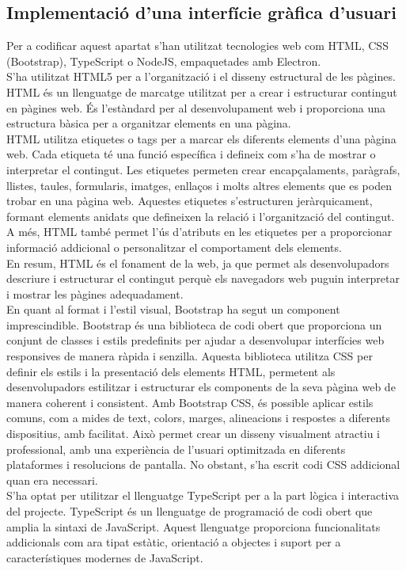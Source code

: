 \subsection{Implementació d’una interfície gràfica d'usuari}
Per a codificar aquest apartat s'han utilitzat tecnologies web com HTML, CSS (Bootstrap), TypeScript o NodeJS, empaquetades amb Electron.
\\[3mm]
S'ha utilitzat HTML5 per a l'organització i el disseny estructural de les pàgines. HTML és un llenguatge de marcatge utilitzat per a crear i estructurar contingut en pàgines web. És l'estàndard per al desenvolupament web i proporciona una estructura bàsica per a organitzar elements en una pàgina. 
\\[3mm]
HTML utilitza etiquetes o tags per a marcar els diferents elements d'una pàgina web. Cada etiqueta té una funció específica i defineix com s'ha de mostrar o interpretar el contingut. Les etiquetes permeten crear encapçalaments, paràgrafs, llistes, taules, formularis, imatges, enllaços i molts altres elements que es poden trobar en una pàgina web. Aquestes etiquetes s'estructuren jeràrquicament, formant elements anidats que defineixen la relació i l'organització del contingut. A més, HTML també permet l'ús d'atributs en les etiquetes per a proporcionar informació addicional o personalitzar el comportament dels elements. 
\\[3mm]
En resum, HTML és el fonament de la web, ja que permet als desenvolupadors descriure i estructurar el contingut perquè els navegadors web puguin interpretar i mostrar les pàgines adequadament.
\\[3mm]
En quant al format i l'estil visual, Bootstrap ha segut un component imprescindible. Bootstrap és una biblioteca de codi obert que proporciona un conjunt de classes i estils predefinits per ajudar a desenvolupar interfícies web responsives de manera ràpida i senzilla. Aquesta biblioteca utilitza CSS per definir els estils i la presentació dels elements HTML, permetent als desenvolupadors estilitzar i estructurar els components de la seva pàgina web de manera coherent i consistent. Amb Bootstrap CSS, és possible aplicar estils comuns, com a mides de text, colors, marges, alineacions i respostes a diferents dispositius, amb facilitat. Això permet crear un disseny visualment atractiu i professional, amb una experiència de l'usuari optimitzada en diferents plataformes i resolucions de pantalla. No obstant, s'ha escrit codi CSS addicional quan era necessari.
\\[3mm]
S'ha optat per utilitzar el llenguatge TypeScript per a la part lògica i interactiva del projecte. TypeScript és un llenguatge de programació de codi obert que amplia la sintaxi de JavaScript. Aquest llenguatge proporciona funcionalitats addicionals com ara tipat estàtic, orientació a objectes i suport per a característiques modernes de JavaScript.
